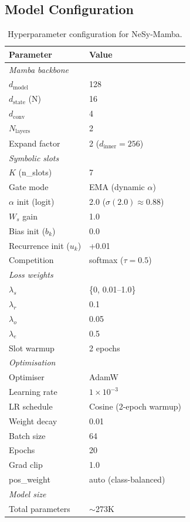 \documentclass[conference]{IEEEtran}
\DeclareRobustCommand{\model}{NeSy-Mamba}
\begin{document}
\subsection{Model Configuration}

\begin{table}[t]
\centering
\small
\caption{Hyperparameter configuration for \model{}.}
\label{tab:hyperparams}
\begin{tabular}{@{}ll@{}}
\toprule
\textbf{Parameter} & \textbf{Value} \\
\midrule
\multicolumn{2}{l}{\textit{Mamba backbone}} \\
$d_\text{model}$ & 128 \\
$d_\text{state}$ (N) & 16 \\
$d_\text{conv}$ & 4 \\
$N_\text{layers}$ & 2 \\
Expand factor & 2 ($d_\text{inner} = 256$) \\
\midrule
\multicolumn{2}{l}{\textit{Symbolic slots}} \\
$K$ (n\_slots) & 7 \\
Gate mode & EMA (dynamic $\alpha$) \\
$\alpha$ init (logit) & 2.0 ($\sigma(2.0) \approx 0.88$) \\
$W_s$ gain & 1.0 \\
Bias init ($b_k$) & 0.0 \\
Recurrence init ($u_k$) & +0.01 \\
Competition & softmax ($\tau = 0.5$) \\
\midrule
\multicolumn{2}{l}{\textit{Loss weights}} \\
$\lambda_s$ & \{0, 0.01--1.0\} \\
$\lambda_r$ & 0.1 \\
$\lambda_o$ & 0.05 \\
$\lambda_e$ & 0.5 \\
Slot warmup & 2 epochs \\
\midrule
\multicolumn{2}{l}{\textit{Optimisation}} \\
Optimiser & AdamW \\
Learning rate & $1 \times 10^{-3}$ \\
LR schedule & Cosine (2-epoch warmup) \\
Weight decay & 0.01 \\
Batch size & 64 \\
Epochs & 20 \\
Grad clip & 1.0 \\
pos\_weight & auto (class-balanced) \\
\midrule
\multicolumn{2}{l}{\textit{Model size}} \\
Total parameters & $\sim$273K \\
\bottomrule
\end{tabular}
\end{table}
\end{document}
